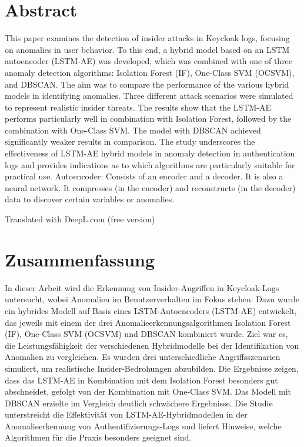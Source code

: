 \documentclass[a4paper,12pt]{article}
\begin{document}
	
	\newpage
	\section*{Abstract}
	This paper examines the detection of insider attacks in Keycloak logs, focusing on anomalies in user behavior. To this end, a hybrid model based on an LSTM autoencoder (LSTM-AE) was developed, which was combined with one of three anomaly detection algorithms: Isolation Forest (IF), One-Class SVM (OCSVM), and DBSCAN. The aim was to compare the performance of the various hybrid models in identifying anomalies. Three different attack scenarios were simulated to represent realistic insider threats. The results show that the LSTM-AE performs particularly well in combination with Isolation Forest, followed by the combination with One-Class SVM. The model with DBSCAN achieved significantly weaker results in comparison. The study underscores the effectiveness of LSTM-AE hybrid models in anomaly detection in authentication logs and provides indications as to which algorithms are particularly suitable for practical use. Autoencoder: Consists of an encoder and a decoder. It is also a neural network. It compresses (in the encoder) and reconstructs (in the decoder) data to discover certain variables or anomalies.
	
	Translated with DeepL.com (free version)
	
	\newpage
	\section*{Zusammenfassung}
	In dieser Arbeit wird die Erkennung von Insider-Angriffen in Keycloak-Logs untersucht, wobei Anomalien im Benutzerverhalten im Fokus stehen. Dazu wurde ein hybrides Modell auf Basis eines LSTM-Autoencoders (LSTM-AE) entwickelt, das jeweils mit einem der drei Anomalieerkennungsalgorithmen Isolation Forest (IF), One-Class SVM (OCSVM) und DBSCAN kombiniert wurde. Ziel war es, die Leistungsfähigkeit der verschiedenen Hybridmodelle bei der Identifikation von Anomalien zu vergleichen. Es wurden drei unterschiedliche Angriffsszenarien simuliert, um realistische Insider-Bedrohungen abzubilden. Die Ergebnisse zeigen, dass das LSTM-AE in Kombination mit dem Isolation Forest besonders gut abschneidet, gefolgt von der Kombination mit One-Class SVM. Das Modell mit DBSCAN erzielte im Vergleich deutlich schwächere Ergebnisse. Die Studie unterstreicht die Effektivität von LSTM-AE-Hybridmodellen in der Anomalieerkennung von Authentifizierungs-Logs und liefert Hinweise, welche Algorithmen für die Praxis besonders geeignet sind.
	\newpage
\end{document}
